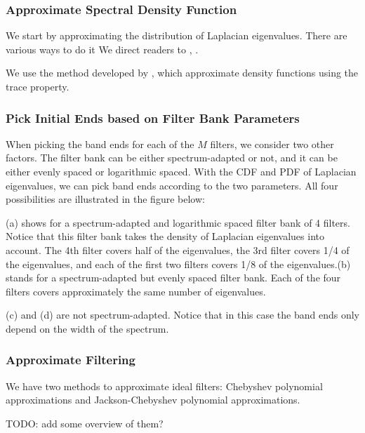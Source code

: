 \documentclass[a4paper]{article}
\theoremstyle{definition}
\begin{document}
\subsubsection{Approximate Spectral Density Function}
We start by approximating the distribution of Laplacian eigenvalues. There are various ways to do it We direct readers to \cite{hammond2011wavelets,shuman_DCOSS_2011}, \cite{approximating spectral densities of large matrices}.

We use the method developed by \cite{x}, which approximate density functions using the trace property.



\subsubsection{Pick Initial Ends based on Filter Bank Parameters}

When picking the band ends for each of the $M$ filters, we consider two other factors. The filter bank can be either spectrum-adapted or not, and it can be either evenly spaced or logarithmic spaced. With the CDF and PDF of Laplacian eigenvalues, we can pick band ends according to the two parameters. All four possibilities are illustrated in the figure below:

\begin{figure}
\centering

\end{figure}

(a) shows for a spectrum-adapted and logarithmic spaced filter bank of 4 filters. Notice that this filter bank takes the density of Laplacian eigenvalues into account. The 4th filter covers half of the eigenvalues, the 3rd filter covers 1/4 of the eigenvalues, and each of the first two filters covers 1/8 of the eigenvalues.(b) stands for a spectrum-adapted but evenly spaced filter bank. Each of the four filters covers approximately the same number of eigenvalues.

(c) and (d) are not spectrum-adapted. Notice that in this case the band ends only depend on the width of the spectrum.

\subsubsection{Approximate Filtering}
We have two methods to approximate ideal filters: Chebyshev polynomial approximations and Jackson-Chebyshev polynomial approximations.

TODO: add some overview of them?
\end{document}
